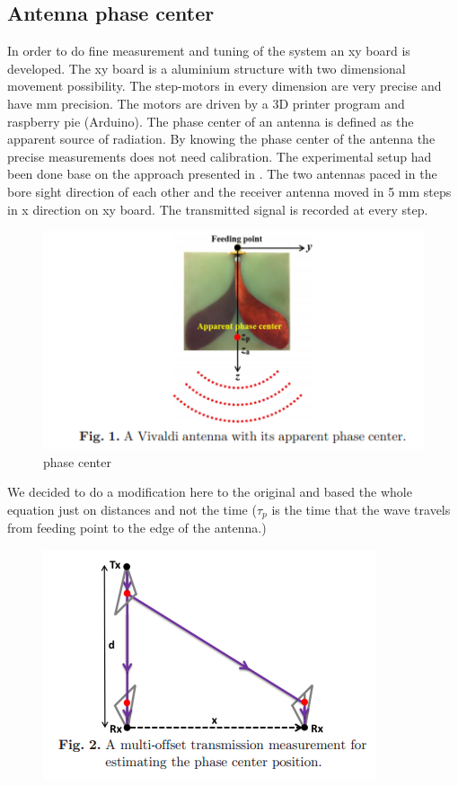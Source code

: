 \subsection{Antenna phase center}
 In order to do fine measurement and tuning of the system an xy board is developed. The xy board is a aluminium structure with two dimensional movement possibility. The step-motors in every dimension are very precise and have mm precision. The motors are driven by a 3D printer program and raspberry pie (Arduino).
The phase center of an antenna is defined as the apparent source of radiation. By knowing the phase center of the antenna the precise measurements does not need calibration.
The experimental setup had been done base on the approach presented in \cite{liu2013phase}. The two antennas paced in the bore sight direction of each other and the receiver antenna moved in 5 mm steps in x direction  on xy board. The transmitted signal is recorded at every step.
\begin{figure}
    \centering
    \includegraphics{Vivaldi/phase center.jpg}
    \caption{phase center}
    \label{fig:my_label}
\end{figure}
We decided to do a modification here to the original and based the whole equation just on distances and not the time ($\tau_p$ is the time that the wave travels from feeding point to the edge of the antenna.)
\begin{figure}
    \centering
    \includegraphics{Vivaldi/phasecenter2.png}
    \caption{}
    \label{fig:my_label2}
\end{figure}

